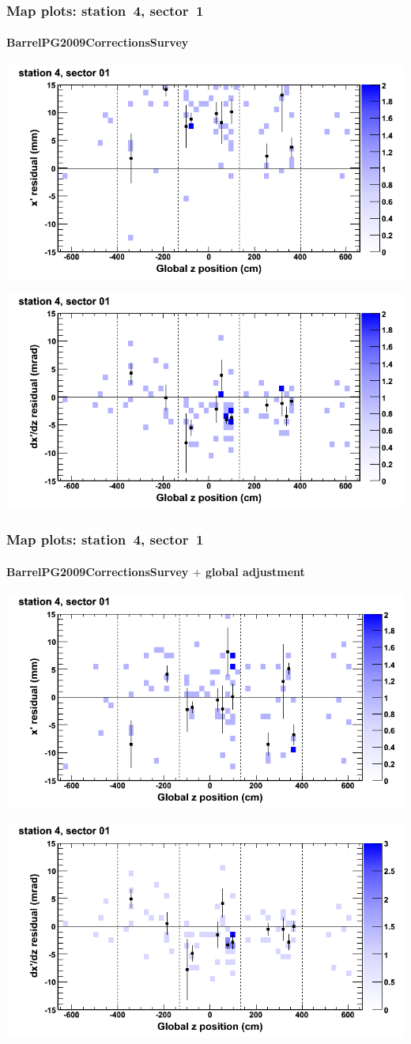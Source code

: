 \documentclass[compress]{beamer}
\begin{document}
\begin{frame}
\frametitle{Map plots: station~4, sector~1}
\framesubtitle{BarrelPG2009CorrectionsSurvey}
\includegraphics[width=0.5\linewidth]{mapplots_01/DTvsz_st4sec01_x.png}

\includegraphics[width=0.5\linewidth]{mapplots_01/DTvsz_st4sec01_dxdz.png}
\end{frame}
\begin{frame}
\frametitle{Map plots: station~4, sector~1}
\framesubtitle{BarrelPG2009CorrectionsSurvey $+$ global adjustment}
\includegraphics[width=0.5\linewidth]{mapplots_re01/DTvsz_st4sec01_x.png}

\includegraphics[width=0.5\linewidth]{mapplots_re01/DTvsz_st4sec01_dxdz.png}
\end{frame}
\end{document}
